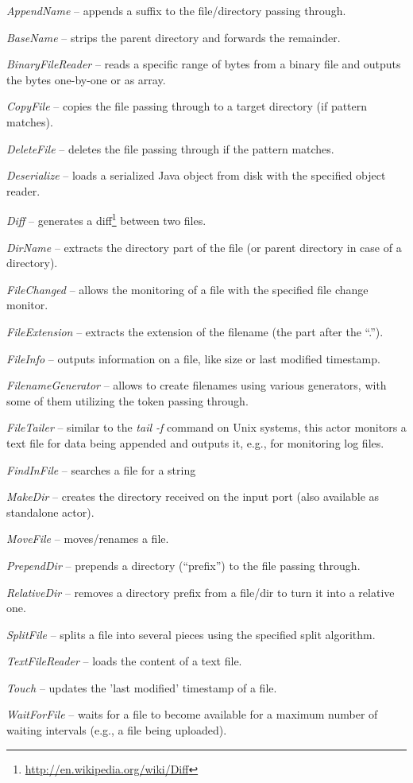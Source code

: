 \begin{tight_itemize}
	\item \textit{AppendName} -- appends a suffix to the file/directory passing
	through.
	\item \textit{BaseName} -- strips the parent directory and forwards the
	remainder.
	\item \textit{BinaryFileReader} -- reads a specific range of bytes from 
	a binary file and outputs the bytes one-by-one or as array.
	\item \textit{CopyFile} -- copies the file passing through to a target
	directory (if pattern matches).
	\item \textit{DeleteFile} -- deletes the file passing through if the pattern
	matches.
	\item \textit{Deserialize} -- loads a serialized Java object from disk with
	the specified object reader.
	\item \textit{Diff} -- generates a diff\footnote{\url{http://en.wikipedia.org/wiki/Diff}{}} 
	between two files.
	\item \textit{DirName} -- extracts the directory part of the file (or parent
	directory in case of a directory).
	\item \textit{FileChanged} -- allows the monitoring of a file with
	the specified file change monitor.
	\item \textit{FileExtension} -- extracts the extension of the filename (the
	part after the ``.'').
	\item \textit{FileInfo} -- outputs information on a file, like size or last
	modified timestamp.
	\item \textit{FilenameGenerator} -- allows to create filenames using various
	generators, with some of them utilizing the token passing through.
	\item \textit{FileTailer} -- similar to the \textit{tail -f} command on
	Unix systems, this actor monitors a text file for data being appended and
	outputs it, e.g., for monitoring log files.
	\item \textit{FindInFile} -- searches a file for a string
	\item \textit{MakeDir} -- creates the directory received on the input port
	(also available as standalone actor).
	\item \textit{MoveFile} -- moves/renames a file.
	\item \textit{PrependDir} -- prepends a directory (``prefix'') to the file
	passing through.
	\item \textit{RelativeDir} -- removes a directory prefix from a file/dir
	to turn it into a relative one.
	\item \textit{SplitFile} -- splits a file into several pieces using the
	specified split algorithm.
	\item \textit{TextFileReader} -- loads the content of a text file.
	\item \textit{Touch} -- updates the 'last modified' timestamp of a file.
	\item \textit{WaitForFile} -- waits for a file to become available for
	a maximum number of waiting intervals (e.g., a file being uploaded).
\end{tight_itemize}
